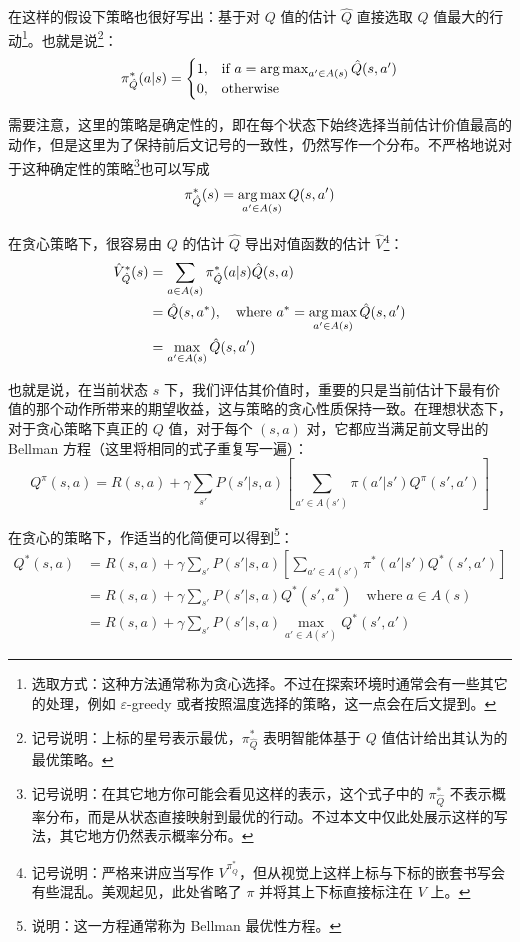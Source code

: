 在这样的假设下策略也很好写出：基于对 $Q$ 值的估计 $\hat Q$ 直接选取 $Q$ 值最大的行动\footnote{选取方式：这种方法通常称为贪心选择。不过在探索环境时通常会有一些其它的处理，例如 $\varepsilon$-greedy 或者按照温度选择的策略，这一点会在后文提到。}。也就是说\footnote{记号说明：上标的星号表示最优，$\pi^*_{\hat Q}$ 表明智能体基于 $Q$ 值估计给出其认为的最优策略。}：
\[
    \pi^*_{\hat Q} (a | s) = \begin{cases}
        1, & \text{if } a = \operatorname*{arg\,max}_{a' \in A(s)} \hat Q(s, a') \\
        0, & \text{otherwise}
    \end{cases}
\]

需要注意，这里的策略是确定性的，即在每个状态下始终选择当前估计价值最高的动作，但是这里为了保持前后文记号的一致性，仍然写作一个分布。不严格地说对于这种确定性的策略\footnote{记号说明：在其它地方你可能会看见这样的表示，这个式子中的 $\pi^*_{\hat Q}$ 不表示概率分布，而是从状态直接映射到最优的行动。不过本文中仅此处展示这样的写法，其它地方仍然表示概率分布。}也可以写成
\[
    \pi^*_{\hat Q} (s) = \operatorname*{arg\,max}_{a' \in A(s)} Q(s, a')
\]

在贪心策略下，很容易由 $Q$ 的估计 $\hat Q$ 导出对值函数的估计 $\hat V$\footnote{记号说明：严格来讲应当写作 $V^{\pi^*_{\hat Q}}$，但从视觉上这样上标与下标的嵌套书写会有些混乱。美观起见，此处省略了 $\pi$ 并将其上下标直接标注在 $V$ 上。}：
\[
\begin{aligned}
    \hat V^*_{\hat Q} (s) &= \sum_{a \in A(s)} \pi^*_{\hat Q} (a | s) \hat Q(s, a) \\
    &= \hat Q(s, a^*), \quad \text{where } a^* = \operatorname*{arg\,max}_{a' \in A(s)} \hat Q(s, a') \\
    &= \max_{a' \in A(s)} \hat Q(s, a')
\end{aligned}
\]

也就是说，在当前状态 $s$ 下，我们评估其价值时，重要的只是当前估计下最有价值的那个动作所带来的期望收益，这与策略的贪心性质保持一致。在理想状态下，对于贪心策略下真正的 $Q$ 值，对于每个 $(s, a)$ 对，它都应当满足前文导出的 Bellman 方程（这里将相同的式子重复写一遍）：
\[
    Q^\pi (s, a) = R(s, a) + \gamma \sum_{s'} P(s' | s, a) \left[\sum_{a' \in A(s')} \pi(a' | s') Q^\pi (s', a')\right]
\]

在贪心的策略下，作适当的化简便可以得到\footnote{说明：这一方程通常称为 Bellman 最优性方程。}：
\[
\begin{aligned}
    Q^* (s, a) &= R(s, a) + \gamma \sum_{s'} P(s' | s, a) \left[
        \sum_{a' \in A(s')} \pi^* (a' | s') Q^* (s', a')
    \right] \\
    &= R(s, a) + \gamma \sum_{s'} P(s' | s, a) Q^* (s', a^*) \quad \text{where} \; a \in A(s)\\
    &= R(s, a) + \gamma \sum_{s'} P(s' | s, a) \max_{a' \in A(s')} Q^* (s', a')
\end{aligned}
\]

